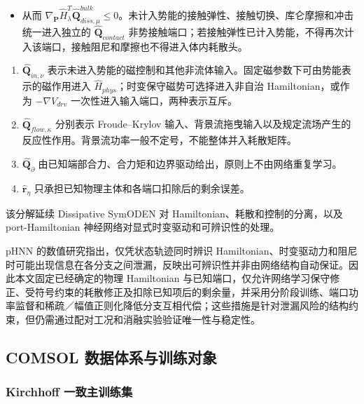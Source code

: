 \begin{itemize}
\tightlist
\item
  从而 \(\nabla_{\mathbf{P}}{\widehat{H}}_{\lambda}^{T}{\widehat{\mathbf{Q}}}_{diss,\mu}^{bulk} \leq 0\)。未计入势能的接触弹性、接触切换、库仑摩擦和冲击统一进入独立的 \({\widehat{\mathbf{Q}}}_{contact}\) 非势接触端口；若接触弹性已计入势能，不得再次计入该端口，接触阻尼和摩擦也不得进入体内耗散头\cite{Zhong2020Dissipative}。
\end{itemize}

\begin{enumerate}
\def\labelenumi{\arabic{enumi}.}
\setcounter{enumi}{1}
\tightlist
\item
  \({\widehat{\mathbf{Q}}}_{in,\nu}\) 表示未进入势能的磁控制和其他非流体输入。固定磁参数下可由势能表示的磁作用进入 \({\widehat{H}}_{phys}\)；时变保守磁势可选择进入非自治 Hamiltonian，或作为 \(- \nabla V_{drv}\) 一次性进入输入端口，两种表示互斥。
\item
  \({\widehat{\mathbf{Q}}}_{flow,\kappa}\) 分别表示 Froude--Krylov 输入、背景流拖曳输入以及规定流场产生的反应性作用。背景流功率一般不定号，不能整体并入耗散矩阵。
\item
  \({\widehat{\mathbf{Q}}}_{\partial}\) 由已知端部合力、合力矩和边界驱动给出，原则上不由网络重复学习。
\item
  \({\widehat{\mathbf{r}}}_{\eta}\) 只承担已知物理主体和各端口扣除后的剩余误差。
\end{enumerate}

该分解延续 Dissipative SymODEN 对 Hamiltonian、耗散和控制的分离，以及 port-Hamiltonian 神经网络对显式时变驱动和可辨识性的处理\cite{Zhong2020Dissipative,Desai2021PHNN}。

pHNN 的数值研究指出，仅凭状态轨迹同时辨识 Hamiltonian、时变驱动力和阻尼时可能出现信息在各分支之间泄漏，反映出可辨识性并非由网络结构自动保证\cite{Desai2021PHNN}。因此本文固定已经确定的物理 Hamiltonian 与已知端口，仅允许网络学习保守修正、受符号约束的耗散修正及扣除已知项后的剩余量，并采用分阶段训练、端口功率监督和稀疏／幅值正则化降低分支互相代偿；这些措施是针对泄漏风险的结构约束，但仍需通过配对工况和消融实验验证唯一性与稳定性。

\subsection{COMSOL 数据体系与训练对象}\label{sec:chnn-4-4}

\subsubsection{Kirchhoff 一致主训练集}\label{sec:chnn-4-4-1}

